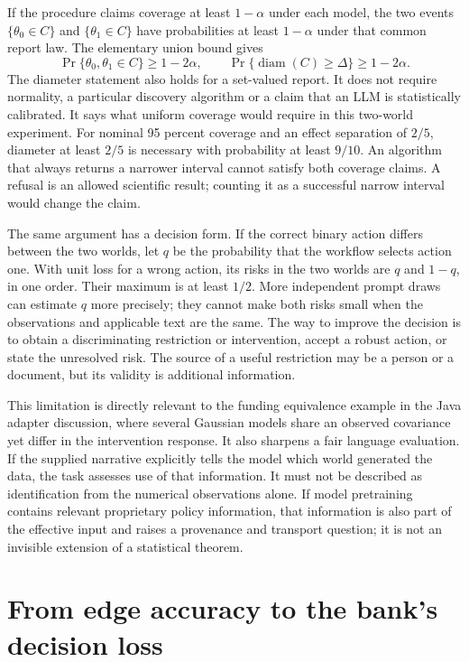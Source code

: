 If the procedure claims coverage at least $1-\alpha$ under each model, the two
events $\{\theta_0\in C\}$ and $\{\theta_1\in C\}$ have probabilities at least
$1-\alpha$ under that common report law. The elementary union bound gives
\begin{equation}
 \Pr\{\theta_0,\theta_1\in C\}\geq 1-2\alpha,
 \qquad
 \Pr\{\operatorname{diam}(C)\geq\Delta\}\geq1-2\alpha.
 \label{exec14:language-information-bound}
\end{equation}
The diameter statement also holds for a set-valued report. It does not require
normality, a particular discovery algorithm or a claim that an LLM is
statistically calibrated. It says what uniform coverage would require in this
two-world experiment. For nominal 95 percent coverage and an effect separation
of $2/5$, diameter at least $2/5$ is necessary with probability at least $9/10$.
An algorithm that always returns a narrower interval cannot satisfy both
coverage claims. A refusal is an allowed scientific result; counting it as a
successful narrow interval would change the claim.

The same argument has a decision form. If the correct binary action differs
between the two worlds, let $q$ be the probability that the workflow selects
action one. With unit loss for a wrong action, its risks in the two worlds are
$q$ and $1-q$, in one order. Their maximum is at least $1/2$. More independent
prompt draws can estimate $q$ more precisely; they cannot make both risks small
when the observations and applicable text are the same. The way to improve the
decision is to obtain a discriminating restriction or intervention, accept a
robust action, or state the unresolved risk. The source of a useful restriction
may be a person or a document, but its validity is additional information.

This limitation is directly relevant to the funding equivalence example in the
Java adapter discussion, where several Gaussian models share an observed
covariance yet differ in the intervention response. It also sharpens a fair
language evaluation. If the supplied narrative explicitly tells the model which
world generated the data, the task assesses use of that information. It must
not be described as identification from the numerical observations alone. If
model pretraining contains relevant proprietary policy information, that
information is also part of the effective input and raises a provenance and
transport question; it is not an invisible extension of a statistical theorem.

\section{From edge accuracy to the bank's decision loss}

